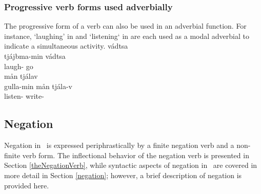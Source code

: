 \subsubsection{Progressive verb forms used adverbially}\label{ADVverbs}
The progressive form of a verb can also be used in an adverbial function. For instance,  ‘laughing’ in  and  ‘listening‘ in  are each used as a modal adverbial to indicate a simultaneous activity. %
\ea\label{ADVverbsEx1}%
\glll	{} vádtsa\\
	tjájbma-min vádtsa\\
	laugh- go\BS{}\\\nopagebreak
{}	
\z
\ea\label{ADVverbsEx2}%
\glll	{} mån tjálav\\
	gulla-min mån tjála-v\\
	listen-  write-\\\nopagebreak
{}	
\z



\subsection{Negation}\label{negationVerb}
Negation in \PS\ is expressed periphrastically by a finite negation verb and a non-finite verb form. The inflectional behavior of the negation verb is presented in Section \ref{theNegationVerb}, while syntactic aspects of negation in \PS\ are covered in more detail in Section \ref{negation}; however, a brief description of negation is provided here. 

